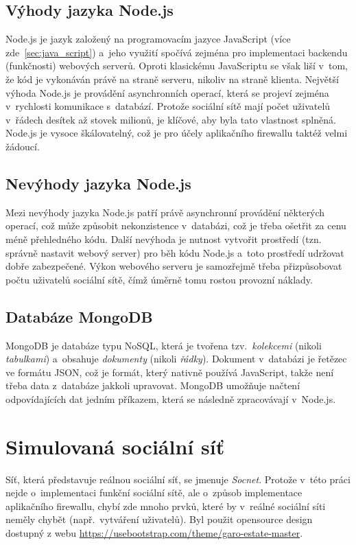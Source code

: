 \subsection*{Výhody jazyka Node.js}
Node.js je jazyk založený na programovacím jazyce JavaScript (více zde~\ref{sec:java_script}) a~jeho využití spočívá zejména pro implementaci backendu (funkčnosti) webových serverů. Oproti klasickému JavaScriptu se však liší v~tom, že kód je vykonáván právě na straně serveru, nikoliv na straně klienta. Největší výhoda Node.js je provádění asynchronních operací, která se projeví zejména v~rychlosti komunikace s~databází. Protože sociální sítě mají počet uživatelů v~řádech desítek až stovek milionů, je klíčové, aby byla tato vlastnost splněná. Node.js je vysoce škálovatelný, což je pro účely aplikačního firewallu taktéž velmi žádoucí.

\subsection*{Nevýhody jazyka Node.js}
Mezi nevýhody jazyka Node.js patří právě asynchronní provádění některých operací, což může způsobit nekonzistence v~databázi, což je třeba ošetřit za cenu méně přehledného kódu. Další nevýhoda je nutnost vytvořit prostředí (tzn. správně nastavit webový server) pro běh kódu Node.js a~toto prostředí udržovat dobře zabezpečené. Výkon webového serveru je samozřejmě třeba přizpůsobovat počtu uživatelů sociální sítě, čímž úměrně tomu rostou provozní náklady.

\subsection*{Databáze MongoDB}
MongoDB je databáze typu NoSQL, která je tvořena tzv.~\textit{kolekcemi} (nikoli \textit{tabulkami}) a~obsahuje \textit{dokumenty} (nikoli \textit{řádky}). Dokument v~databázi je řetězec ve formátu JSON, což je formát, který nativně používá JavaScript, takže není třeba data z~databáze jakkoli upravovat. MongoDB umožňuje načtení odpovídajících dat jedním příkazem, která se následně zpracovávají v~Node.js.

\section{Simulovaná sociální síť}
Síť, která představuje reálnou sociální síť, se jmenuje \textit{Socnet}. Protože v~této práci nejde o~implementaci funkční sociální sítě, ale o~způsob implementace aplikačního firewallu, chybí zde mnoho prvků, které by v~reálné sociální síti neměly chybět (např.~vytváření uživatelů). Byl použit opensource design dostupný z webu \href{https://usebootstrap.com/theme/garo-estate-master}{https://usebootstrap.com/theme/garo-estate-master}.

